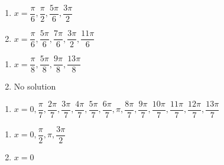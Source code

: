 \begin{multicols}{2}

\begin{enumerate}

\setcounter{enumi}{\value{HW}}

\item $x = \dfrac{\pi}{6}, \dfrac{\pi}{2}, \dfrac{5\pi}{6}, \dfrac{3\pi}{2}$
\item $x = \dfrac{\pi}{6}, \dfrac{5\pi}{6}, \dfrac{7\pi}{6}, \dfrac{3\pi}{2}, \dfrac{11\pi}{6}$

\setcounter{HW}{\value{enumi}}

\end{enumerate}

\end{multicols}

\begin{multicols}{2}

\begin{enumerate}

\setcounter{enumi}{\value{HW}}

\item $x = \dfrac{\pi}{8}, \dfrac{5\pi}{8}, \dfrac{9\pi}{8}, \dfrac{13\pi}{8}$
\item No solution 

\setcounter{HW}{\value{enumi}}

\end{enumerate}

\end{multicols}

\begin{enumerate}

\setcounter{enumi}{\value{HW}}

\item $x = 0, \dfrac{\pi}{7}, \dfrac{2\pi}{7}, \dfrac{3\pi}{7}, \dfrac{4\pi}{7}, \dfrac{5\pi}{7}, \dfrac{6\pi}{7}, \pi, \dfrac{8\pi}{7}, \dfrac{9\pi}{7}, \dfrac{10\pi}{7}, \dfrac{11\pi}{7}, \dfrac{12\pi}{7}, \dfrac{13\pi}{7}$

\setcounter{HW}{\value{enumi}}

\end{enumerate}

\begin{multicols}{2}

\begin{enumerate}

\setcounter{enumi}{\value{HW}}

\item  $x=0, \dfrac{\pi}{2}, \pi, \dfrac{3\pi}{2}$

\item $x = 0$ 

\setcounter{HW}{\value{enumi}}

\end{enumerate}

\end{multicols}

